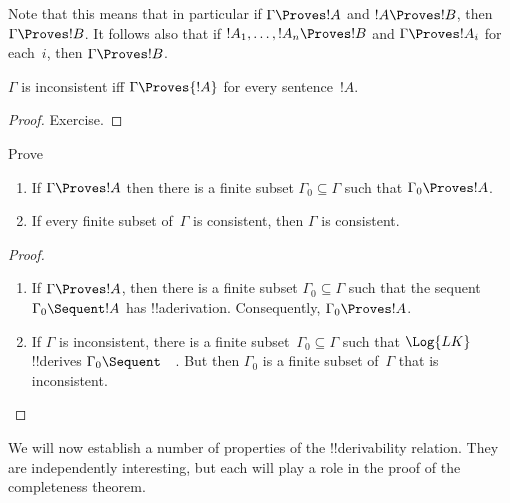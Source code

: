 Note that this means that in particular if $\Gamma \Proves !A$ and $!A
\Proves !B$, then $\Gamma \Proves !B$. It follows also that if $!A_1,
\dots, !A_n \Proves !B$ and $\Gamma \Proves !A_i$ for each~$i$, then
$\Gamma \Proves !B$.

\begin{prop}
$\Gamma$ is inconsistent iff $\Gamma \Proves {!A}$ for every
  sentence~$!A$.
\end{prop}

\begin{proof}
Exercise.
\end{proof}

\begin{prob}
Prove 
\end{prob}

\begin{prop}[Compactness]
  \begin{enumerate}
  \item If $\Gamma \Proves !A$ then there is a finite subset $\Gamma_0
    \subseteq \Gamma$ such that $\Gamma_0 \Proves !A$.
  \item If every finite subset of~$\Gamma$ is
    consistent, then $\Gamma$ is consistent.
  \end{enumerate}
\end{prop}

\begin{proof}
  \begin{enumerate}
    \item If $\Gamma \Proves !A$, then there is a finite subset
      $\Gamma_0 \subseteq \Gamma$ such that the sequent $\Gamma_0
      \Sequent !A$ has !!a{derivation}. Consequently, $\Gamma_0
      \Proves !A$.
    \item If $\Gamma$ is inconsistent, there is a finite
      subset~$\Gamma_0 \subseteq \Gamma$ such that $\Log{LK}$
      !!{derive}s $\Gamma_0 \Sequent \quad$. But then $\Gamma_0$ is a
      finite subset of~$\Gamma$ that is inconsistent.
  \end{enumerate}
\end{proof}







We will now establish a number of properties of the !!{derivability}
relation.  They are independently interesting, but each will play a
role in the proof of the completeness theorem.

